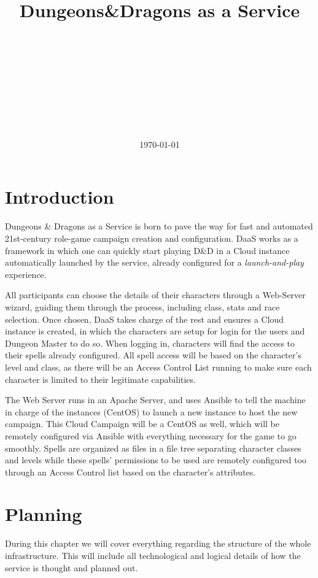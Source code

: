 \documentclass[a4paper,12pt]{report}
\title{{\Huge\textbf{Dungeons\&Dragons as a Service}}}
\author{\Large \firstauthor\\\Large \secondauthor\\\thirdauthor\\\fourthauthor\\\mbox{}\\\mbox{}\\\docversion\\\mbox{}\\\githublink}
\date{\today}
\begin{document}
\renewcommand{\thepage}{\roman{page}}
\maketitle
\tableofcontents
{}

\chapter{Introduction}
\setcounter{page}{1}
\renewcommand{\thepage}{\arabic{page}}

Dungeons \& Dragons as a Service is born to pave the way for fast and automated 21st-century role-game campaign creation and configuration. DaaS works as a framework in which one can quickly start playing D\&D in a Cloud instance automatically launched by the service, already configured for a \textit{launch-and-play} experience. 

All participants can choose the details of their characters through a Web-Server wizard, guiding them through the process, including class, stats and race selection. Once chosen, DaaS takes charge of the rest and ensures a Cloud instance is created, in which the characters are setup for login for the users and Dungeon Master to do so. When logging in, characters will find the access to their spells already configured. All spell access will be based on the character's level and class, as there will be an Access Control List running to make sure each character is limited to their legitimate capabilities.

The Web Server runs in an Apache Server, and uses Ansible to tell the machine in charge of the instances (CentOS) to launch a new instance to host the new campaign. This Cloud Campaign will be a CentOS as well, which will be remotely configured via Ansible with everything necessary for the game to go smoothly. Spells are organized as files in a file tree separating character classes and levels while these spells' permissions to be used are remotely configured too through an Access Control list based on the character's attributes.



\chapter{Planning}
\label{ch:plan}

During this chapter we will cover everything regarding the structure of the whole infrastructure. This will include all technological and logical details of how the service is thought and planned out.
\end{document}
